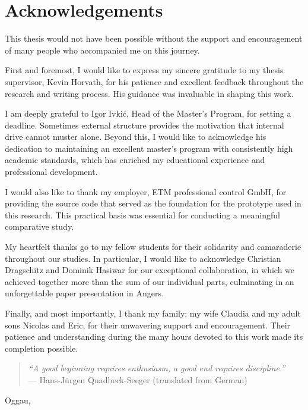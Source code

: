 \thispagestyle{empty}
\chapter{Acknowledgements}

This thesis would not have been possible without the support and encouragement of many people who accompanied me on this journey.

First and foremost, I would like to express my sincere gratitude to my thesis supervisor, Kevin Horvath, for his patience and excellent feedback throughout the research and writing process.
His guidance was invaluable in shaping this work.

I am deeply grateful to Igor Ivkić, Head of the Master's Program, for setting a deadline.
Sometimes external structure provides the motivation that internal drive cannot muster alone.
Beyond this, I would like to acknowledge his dedication to maintaining an excellent master's program with consistently high academic standards, which has enriched my educational experience and professional development.

I would also like to thank my employer, ETM professional control GmbH, for providing the source code that served as the foundation for the prototype used in this research.
This practical basis was essential for conducting a meaningful comparative study.

My heartfelt thanks go to my fellow students for their solidarity and camaraderie throughout our studies.
In particular, I would like to acknowledge Christian Dragschitz and Dominik Hasiwar for our exceptional collaboration, in which we achieved together more than the sum of our individual parts, culminating in an unforgettable paper presentation in Angers.

Finally, and most importantly, I thank my family: my wife Claudia and my adult sons Nicolas and Eric, for their unwavering support and encouragement.
Their patience and understanding during the many hours devoted to this work made its completion possible.

\vspace{1cm}

\begin{quote}
\textit{``A good beginning requires enthusiasm, a good end requires discipline.''}\\
--- Hans-Jürgen Quadbeck-Seeger (translated from German)
\end{quote}

\vspace{2cm}

\begin{flushleft}
    \yourNameInclTitle
\end{flushleft}
Oggau, \thesisDate 

\clearpage
